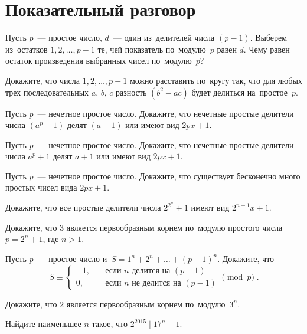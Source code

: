 
\section*{Показательный разговор}


\begingroup
    \providecommand\divides{\mathrel{\vert}}

\begin{problems}

\item
Пусть $p$~--- простое число, $d$~--- один из~делителей числа $(p - 1)$.
Выберем из~остатков $1, 2, \ldots, p - 1$ те, чей показатель по~модулю~$p$
равен $d$.
Чему равен остаток произведения выбранных чисел по~модулю~$p$?

\item
Докажите, что числа $1, 2, \ldots, p - 1$ можно расставить по~кругу так, что
для любых трех последовательных $a$, $b$, $c$ разность
$(b^2 - a c)$ будет делиться на~простое~$p$.

\item
Пусть $p$~--- нечетное простое число.
Докажите, что нечетные простые делители числа $(a^p - 1)$ делят $(a - 1)$ или
имеют вид $2 p x + 1$.

\item
Пусть $p$~--- нечетное простое число.
Докажите, что нечетные простые делители числа $a^p + 1$ делят $a + 1$ или имеют
вид $2 p x + 1$.

\item
Пусть $p$~--- нечетное простое число.
Докажите, что существует бесконечно много простых чисел вида $2 p x + 1$.

\item
Докажите, что все простые делители числа $2^{2^n} + 1$ имеют вид
$2^{n+1} x + 1$.

\item
Докажите, что $3$ является первообразным корнем по~модулю простого числа
$p = 2^n + 1$, где $n > 1$.

\item
Пусть $p$~--- простое число и~$S = 1^n + 2^n + \ldots + (p - 1)^n$.
Докажите, что
\[
    S
\equiv
    \begin{cases}
       -1, & \quad \text{если $n$ делится на~$(p - 1)$}
    \\
        0, & \quad \text{если $n$ не~делится на~$(p - 1)$}
    \end{cases}
\pmod{p}
\; . \]

\item
Докажите, что $2$ является первообразным корнем по~модулю~$3^n$.

\item
Найдите наименьшее $n$ такое, что $2^{2015} \divides 17^n - 1$.

\end{problems}

